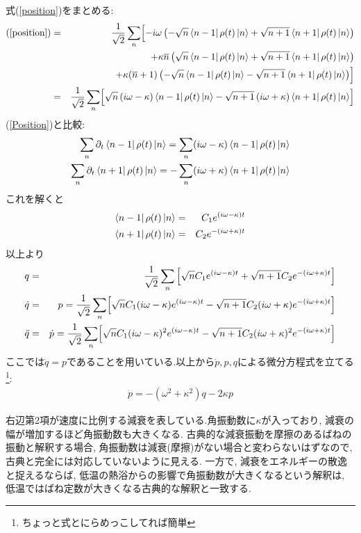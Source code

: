 \documentclass[10.5pt,a4paper]{jreport}
\begin{document}
式(\ref{position})をまとめる:
\begin{eqnarray}
  \nonumber (\ref{position}) &=& \frac{1}{\sqrt{2}}\sum_n\Bigl[-i\omega\left(-\sqrt{n}\bra{n-1}\rho(t)\ket{n}+\sqrt{n+1}\bra{n+1}\rho(t)\ket{n}\right)\\
    \nonumber    &&+ \kappa\overline{n}\left( \sqrt{n}\bra{n-1}\rho(t)\ket{n}+\sqrt{n+1}\bra{n+1}\rho(t)\ket{n}\right)\\
    &&+ \kappa(\overline{n}+1)\left(-\sqrt{n}\bra{n-1}\rho(t)\ket{n}-\sqrt{n+1}\bra{n+1}\rho(t)\ket{n}\right)\Bigr]\label{positon2}\\
  &=& \frac{1}{\sqrt{2}}\sum_n\Bigl[\sqrt{n}\left(i\omega - \kappa\right)\bra{n-1}\rho(t)\ket{n}-\sqrt{n+1}\left(i\omega+\kappa\right)\bra{n+1}\rho(t)\ket{n} \Bigr]
\end{eqnarray}
(\ref{Position})と比較:
\begin{eqnarray}
  \sum_n \partial_t\bra{n-1}\rho(t)\ket{n} = \sum_n (i\omega - \kappa)\bra{n-1}\rho(t)\ket{n}\\
  \sum_n \partial_t\bra{n+1}\rho(t)\ket{n} = -\sum_n (i\omega + \kappa)\bra{n+1}\rho(t)\ket{n}
\end{eqnarray}
これを解くと
\begin{eqnarray}
  \bra{n-1}\rho(t)\ket{n} &=& C_1e^{(i\omega - \kappa)t}\\
  \bra{n+1}\rho(t)\ket{n} &=& C_2e^{-(i\omega + \kappa)t}
\end{eqnarray}
以上より
\begin{eqnarray}
  q &=& \frac{1}{\sqrt{2}}\sum_n\left[\sqrt{n}C_1e^{(i\omega - \kappa)t} + \sqrt{n+1}C_2e^{-(i\omega + \kappa)t}\right]\\
  \dot{q} &=& p = \frac{1}{\sqrt{2}}\sum_n\Bigl[\sqrt{n}C_1(i\omega - \kappa)e^{(i\omega - \kappa)t}- \sqrt{n+1}C_2(i\omega + \kappa)e^{-(i\omega + \kappa)t}\Bigr]\\
  \ddot{q} &=& \dot{p} = \frac{1}{\sqrt{2}}\sum_n\Bigl[\sqrt{n}C_1(i\omega - \kappa)^2e^{(i\omega - \kappa)t}- \sqrt{n+1}C_2(i\omega + \kappa)^2e^{-(i\omega + \kappa)t}\Bigr]
\end{eqnarray}
ここでは$\dot{q} = p$であることを用いている.以上から$\dot{p}, p, q$による微分方程式を立てる\footnote{ちょっと式とにらめっこしてれば簡単}:
\begin{eqnarray}
  \dot{p} = -(\omega^2 + \kappa^2)q -2\kappa p
\end{eqnarray}

右辺第2項が速度に比例する減衰を表している.角振動数に$\kappa$が入っており, 減衰の幅が増加するほど角振動数も大きくなる. 古典的な減衰振動を摩擦のあるばねの振動と解釈する場合, 角振動数は減衰(摩擦)がない場合と変わらないはずなので, 古典と完全には対応していないように見える.
一方で, 減衰をエネルギーの散逸と捉えるならば, 低温の熱浴からの影響で角振動数が大きくなるという解釈は, 低温ではばね定数が大きくなる古典的な解釈と一致する.
\end{document}
